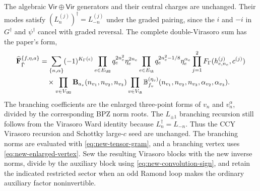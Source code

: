 The algebraic $\mathsf{Vir}\oplus\mathsf{Vir}$ generators and their
central charges are unchanged.  Their modes satisfy
$(L_n^{(j)})^\dagger=L_{-n}^{(j)}$ under the graded pairing, since
the $i$ and $-i$ in $G^\dagger$ and $\psi^\dagger$ cancel with graded
reversal.  The complete double-Virasoro sum has the paper's form,
\begin{align}
 \widehat{\mathbf F}_{\hat\Gamma}^{\{f,\eta,a\}}
 &=\sum_{\{n,\alpha\}}(-1)^{K_\Gamma(\epsilon)}
   \prod_{e\in E_{\NS}}q_e^{2n_e^2}\eta_e^{2n_e}
   \prod_{e\in E_{\R}}q_e^{2n_e^2-1/8}\eta_e^{\alpha_e}
   \prod_{j=1}^2 F_\Gamma(h_{e,n_e}^{(j)},c^{(j)})\nonumber\\
 &\quad\times\prod_{v\in V_{\NS}}\mathbf B_{a_v}(n_{v_1},n_{v_2},n_{v_3})
   \prod_{v\in V_{\R}}\mathbb B_{f_v}^{(\eta_v)}
   (n_{v_1},n_{v_2},n_{v_3},\alpha_{v_2},\alpha_{v_3}).
 \label{eq:new-double-virasoro}
\end{align}
The branching coefficients are the enlarged three-point forms of
$v_n$ and $v_n^\alpha$, divided by the corresponding BPZ norm
roots.  The $L_{\pm1}$ branching recursion still follows from the
Virasoro Ward identity because $L_n^\dagger=L_{-n}$.
Thus the CCY Virasoro recursion and Schottky large-$c$
seed are unchanged.  The branching norms are evaluated with
\eqref{eq:new-tensor-gram}, and a branching vertex uses
\eqref{eq:new-enlarged-vertex}.  Sew the resulting Virasoro blocks
with the new inverse norms, divide by the auxiliary block using
\eqref{eq:new-convolution-sign}, and retain the indicated restricted
sector when an odd Ramond loop makes the ordinary auxiliary factor
noninvertible.

